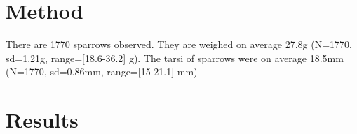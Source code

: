 \documentclass[a4paper]{article}
\begin{document}
	\section{Method}
	There are 1770 sparrows observed.  They are weighed on average 27.8g (N=1770, sd=1.21g, range=[18.6-36.2] g).  The tarsi of sparrows were on average 18.5mm (N=1770, sd=0.86mm, range=[15-21.1] mm)
	\section{Results}
\end{document}
